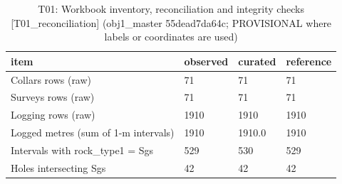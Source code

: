 \begin{table}[htbp]
\centering
\caption{T01: Workbook inventory, reconciliation and integrity checks [T01\_reconciliation] (obj1\_master 55dead7da64c; PROVISIONAL where labels or coordinates are used)}
\begin{tabular}{llll}
\toprule
item & observed & curated & reference \\
\midrule
Collars rows (raw) & 71 & 71 & 71 \\
Surveys rows (raw) & 71 & 71 & 71 \\
Logging rows (raw) & 1910 & 1910 & 1910 \\
Logged metres (sum of 1-m intervals) & 1910 & 1910.0 & 1910 \\
Intervals with rock\_type1 = Sgs & 529 & 530 & 529 \\
Holes intersecting Sgs & 42 & 42 & 42 \\
\bottomrule
\end{tabular}
\end{table}
